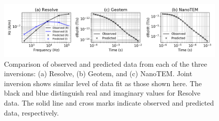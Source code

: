 \begin{figure}
    \begin{center}
    \includegraphics[width=\columnwidth]{figures/obs-vs-pred.png}
    \end{center}
\caption{
    Comparison of observed and predicted data from each of the three inversions: (a) Resolve, (b) Geotem, and (c) NanoTEM. Joint inversion shows similar level of data fit as those shown here. The black and blue distinguish real and imaginary values for Resolve data. The solid line and cross marks indicate observed and predicted data, respectively.
}
\label{fig:obs-vs-pred}
\end{figure}


